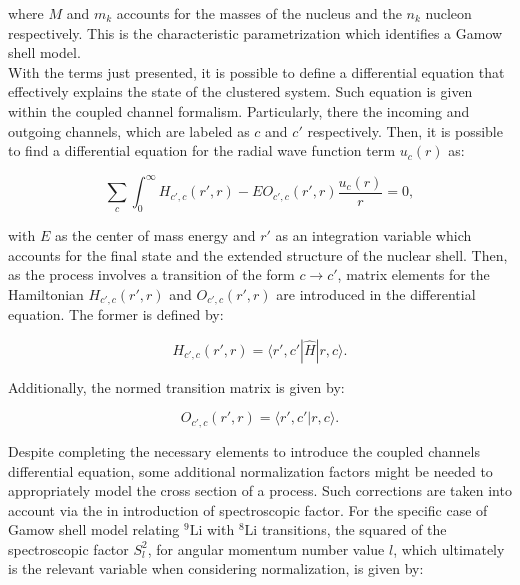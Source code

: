 \documentclass[openany]{book}
\begin{document}
where $M$ and $m_k$ accounts for the masses of the nucleus and the $n_k$ nucleon respectively. This is the characteristic parametrization which identifies a Gamow shell model. \\

With the terms just presented, it is possible to define a differential equation that effectively explains the state of the clustered system. Such equation is given within the coupled channel formalism. Particularly, there the incoming and outgoing channels, which are labeled as $c$ and $c'$ respectively. Then, it is possible to find a differential equation for the radial wave function term $u_c(r)$ as:

\begin{equation}\label{eq:micro_shellGamow_coupledCahnnel}
	\sum_c \int_0^\infty {H_{c', c} (r', r) - E O_{c', c}(r', r ) \frac{u_c(r)}{r}} = 0,
\end{equation}

with $E$ as the center of mass energy and $r'$ as an integration variable which accounts for the final state and the extended structure of the nuclear shell. Then, as the process involves a transition of the form $c \rightarrow c'$, matrix elements for the Hamiltonian $H_{c', c} (r', r)$ and $O_{c', c}(r', r )$ are introduced in the differential equation. The former is defined by:

\begin{equation}\label{eq:micro_shellGamow_coupledCahnnel_hamiltonian}
	H_{c', c} (r', r) = \langle r', c' | \hat H |  r, c \rangle. 
\end{equation}

Additionally, the normed transition matrix is given by:

\begin{equation}\label{eq:micro_shellGamow_coupledCahnnel_normOperator}
		O_{c', c} (r', r) = \langle r', c' |  r, c \rangle. 
\end{equation}

Despite completing the necessary elements to introduce the coupled channels differential equation, some additional normalization factors might be needed to appropriately model the cross section of a process. Such corrections are taken into account via the in introduction of spectroscopic factor. For the specific case of  Gamow shell model relating $\mathrm{{}^{9}Li}$ with $\mathrm{{}^{8}Li}$ transitions, the squared of the spectroscopic factor $S^2_{l}$, for angular momentum number value $l$,  which ultimately is the relevant variable when considering normalization, is given by:
\end{document}
